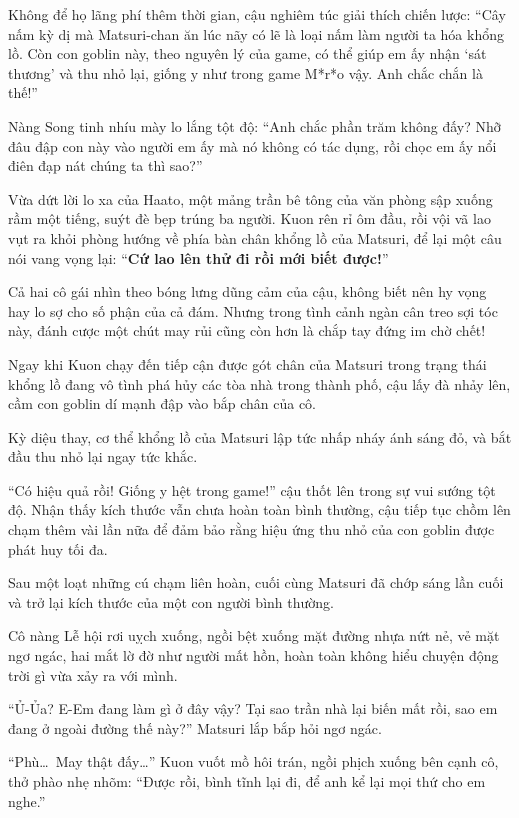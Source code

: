 \documentclass[../main.tex]{subfiles}
\begin{document}
Không để họ lãng phí thêm thời gian, cậu nghiêm túc giải thích chiến lược: ``Cây nấm kỳ dị mà Matsuri-chan ăn lúc nãy có lẽ là loại nấm làm người ta hóa khổng lồ. Còn con goblin này, theo nguyên lý của game, có thể giúp em ấy nhận `sát thương' và thu nhỏ lại, giống y như trong game M*r*o vậy. Anh chắc chắn là thế!''

Nàng Song tinh nhíu mày lo lắng tột độ: ``Anh chắc phần trăm không đấy? Nhỡ đâu đập con này vào người em ấy mà nó không có tác dụng, rồi chọc em ấy nổi điên đạp nát chúng ta thì sao?''

Vừa dứt lời lo xa của Haato, một mảng trần bê tông của văn phòng sập xuống rầm một tiếng, suýt đè bẹp trúng ba người. Kuon rên rỉ ôm đầu, rồi vội vã lao vụt ra khỏi phòng hướng về phía bàn chân khổng lồ của Matsuri, để lại một câu nói vang vọng lại: ``\textbf{Cứ lao lên thử đi rồi mới biết được!}''

Cả hai cô gái nhìn theo bóng lưng dũng cảm của cậu, không biết nên hy vọng hay lo sợ cho số phận của cả đám. Nhưng trong tình cảnh ngàn cân treo sợi tóc này, đánh cược một chút may rủi cũng còn hơn là chắp tay đứng im chờ chết!

\ct

Ngay khi Kuon chạy đến tiếp cận được gót chân của Matsuri trong trạng thái khổng lồ đang vô tình phá hủy các tòa nhà trong thành phố, cậu lấy đà nhảy lên, cầm con goblin dí mạnh đập vào bắp chân của cô.

Kỳ diệu thay, cơ thể khổng lồ của Matsuri lập tức nhấp nháy ánh sáng đỏ, và bắt đầu thu nhỏ lại ngay tức khắc.

``Có hiệu quả rồi! Giống y hệt trong game!'' cậu thốt lên trong sự vui sướng tột độ. Nhận thấy kích thước vẫn chưa hoàn toàn bình thường, cậu tiếp tục chồm lên chạm thêm vài lần nữa để đảm bảo rằng hiệu ứng thu nhỏ của con goblin được phát huy tối đa.

Sau một loạt những cú chạm liên hoàn, cuối cùng Matsuri đã chớp sáng lần cuối và trở lại kích thước của một con người bình thường.

Cô nàng Lễ hội rơi uỵch xuống, ngồi bệt xuống mặt đường nhựa nứt nẻ, vẻ mặt ngơ ngác, hai mắt lờ đờ như người mất hồn, hoàn toàn không hiểu chuyện động trời gì vừa xảy ra với mình.

``Ủ-Ủa? E-Em đang làm gì ở đây vậy? Tại sao trần nhà lại biến mất rồi, sao em đang ở ngoài đường thế này?'' Matsuri lắp bắp hỏi ngơ ngác.


``Phù\dots\ May thật đấy\dots'' Kuon vuốt mồ hôi trán, ngồi phịch xuống bên cạnh cô, thở phào nhẹ nhõm: ``Được rồi, bình tĩnh lại đi, để anh kể lại mọi thứ cho em nghe.''
\end{document}
